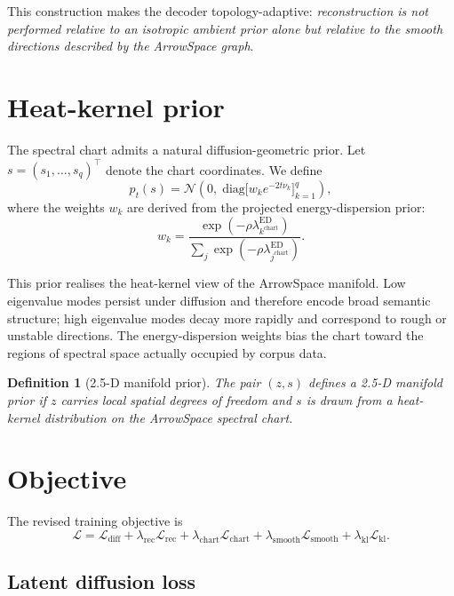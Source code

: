 \documentclass[11pt]{article}
\newtheorem{definition}{Definition}
\newcommand{\ed}{\lambda^{\mathrm{ED}}}
\begin{document}
This construction makes the decoder topology-adaptive: \emph{reconstruction is not
performed relative to an isotropic ambient prior alone but relative to the
smooth directions described by the ArrowSpace graph}.

\section{Heat-kernel prior}
\label{sec:heat_kernel}

The spectral chart admits a natural diffusion-geometric prior. Let
$s = (s_1,\ldots,s_q)^\top$ denote the chart coordinates. We define
\[p_t(s) = \mathcal{N} \left( 0,\; \mathrm{diag}\bigl[w_k e^{-2t\nu_k}\bigr]_{k=1}^q \right),\]
where the weights $w_k$ are derived from the projected energy-dispersion prior:
\[w_k = \frac{\exp(-\rho \ed_{k^{\mathrm{chart}}})} {\sum_j \exp(-\rho \ed_{j^{\mathrm{chart}}})}.\]

This prior realises the heat-kernel view of the ArrowSpace manifold. Low
eigenvalue modes persist under diffusion and therefore encode broad semantic
structure; high eigenvalue modes decay more rapidly and correspond to rough or
unstable directions. The energy-dispersion weights bias the chart toward the
regions of spectral space actually occupied by corpus data.

\begin{definition}[2.5-D manifold prior]
The pair $(z,s)$ defines a 2.5-D manifold prior if $z$ carries local spatial
degrees of freedom and $s$ is drawn from a heat-kernel distribution on the
ArrowSpace spectral chart.
\end{definition}

\section{Objective}
\label{sec:objective}

The revised training objective is
\[\mathcal{L} = \mathcal{L}_{\mathrm{diff}} + \lambda_{\mathrm{rec}}\mathcal{L}_{\mathrm{rec}} + \lambda_{\mathrm{chart}}\mathcal{L}_{\mathrm{chart}} + \lambda_{\mathrm{smooth}}\mathcal{L}_{\mathrm{smooth}} + \lambda_{\mathrm{kl}}\mathcal{L}_{\mathrm{kl}}.\]

\subsection{Latent diffusion loss}
\label{sec:loss_diff}
\end{document}
